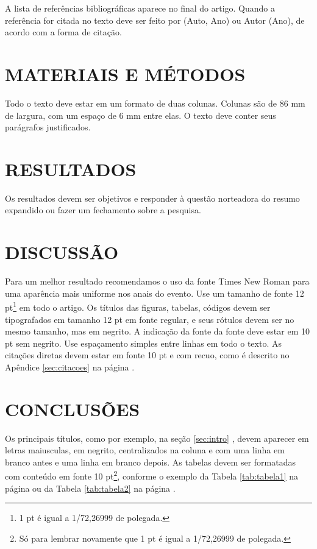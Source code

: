 \documentclass[12pt,a4paper,oneside,linenumbers=off,latinmodern=off,timesnews=off,spanish,english,portuges]{rctart-class/rctart}
\begin{document}
A lista de referências bibliográficas aparece no final do artigo. Quando a referência for citada no texto deve ser feito por (Auto, Ano) ou Autor (Ano), de acordo com a forma de citação.


\section{MATERIAIS E MÉTODOS}

Todo o texto deve estar em um formato de duas colunas. Colunas são de 86 mm de largura, com um espaço de 6 mm entre elas. O texto deve conter seus parágrafos justificados.


\section{RESULTADOS}

Os resultados devem ser objetivos e responder à questão norteadora do resumo expandido ou fazer um fechamento sobre a pesquisa.
 
 \section{DISCUSSÃO}

 Para um melhor resultado recomendamos o uso da fonte Times New Roman para uma aparência mais uniforme nos anais do evento. Use um tamanho de fonte 12 pt\footnote{1 pt é igual a 1/72,26999 de polegada.} em todo o artigo. Os títulos das figuras, tabelas, códigos devem ser tipografados em tamanho 12 pt em fonte regular, e seus rótulos devem ser no mesmo tamanho, mas em negrito. A indicação da fonte da fonte deve estar em 10 pt sem negrito. Use espaçamento simples entre linhas em todo o texto. As citações diretas devem estar em fonte 10 pt e com recuo, como é descrito no Apêndice \ref{sec:citacoes} na página \pageref{sec:citacoes}.


\section{CONCLUSÕES}

Os principais títulos, como por exemplo, na seção \ref{sec:intro} , devem aparecer em letras maiusculas, em negrito, centralizados na coluna e com uma linha em branco antes e uma linha em branco depois. As tabelas devem ser formatadas com conteúdo em fonte 10 pt\footnote{Só para lembrar novamente que 1 pt é igual a 1/72,26999 de polegada.}, conforme o exemplo da Tabela \ref{tab:tabela1} na página \pageref{tab:tabela1} ou da Tabela  \ref{tab:tabela2} na página \pageref{tab:tabela2}.
\end{document}
